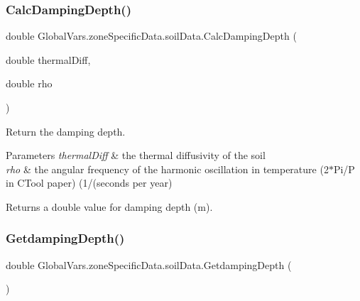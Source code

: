 \subsubsection{\texorpdfstring{CalcDampingDepth()}{CalcDampingDepth()}}
{\footnotesize\ttfamily double Global\+Vars.\+zone\+Specific\+Data.\+soil\+Data.\+Calc\+Damping\+Depth (\begin{DoxyParamCaption}\item[{double}]{thermal\+Diff,  }\item[{double}]{rho }\end{DoxyParamCaption})\hspace{0.3cm}{\ttfamily [inline]}}



Return the damping depth. 


\begin{DoxyParams}{Parameters}
{\em thermal\+Diff} & the thermal diffusivity of the soil \\
\hline
{\em rho} & the angular frequency of the harmonic oscillation in temperature (2$\ast$\+Pi/P in C\+Tool paper) (1/(seconds per year)\\
\hline
\end{DoxyParams}
\begin{DoxyReturn}{Returns}
a double value for damping depth (m). 
\end{DoxyReturn}
\mbox{\label{struct_global_vars_1_1zone_specific_data_1_1soil_data_a3c6e5c9493ccc4e2097cf1c44fdf42b1}} 
\subsubsection{\texorpdfstring{GetdampingDepth()}{GetdampingDepth()}}
{\footnotesize\ttfamily double Global\+Vars.\+zone\+Specific\+Data.\+soil\+Data.\+Getdamping\+Depth (\begin{DoxyParamCaption}{ }\end{DoxyParamCaption})\hspace{0.3cm}{\ttfamily [inline]}}

\mbox{\label{struct_global_vars_1_1zone_specific_data_1_1soil_data_a510ebb36fe6c8151c41361fb5b285d1e}} 
